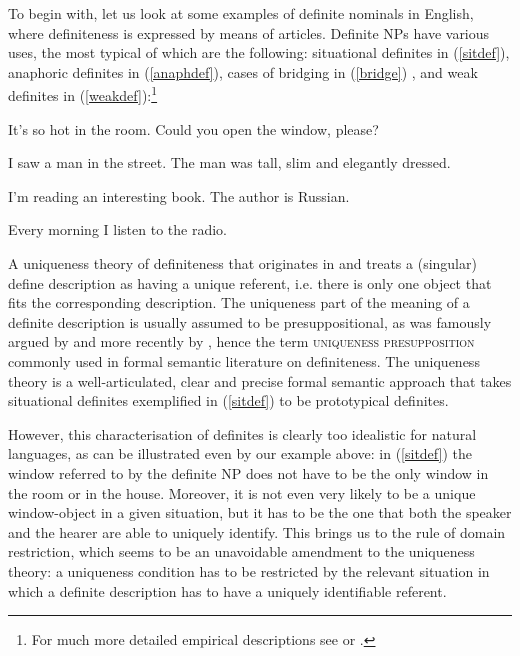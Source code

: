 \documentclass[output=paper,colorlinks,citecolor=brown]{langscibook}
\begin{document}
To begin with, let us look at some examples of definite nominals in English, where definiteness is expressed by means of articles. Definite NPs have various uses, the most typical of which are the following: situational definites in (\ref{sitdef}), anaphoric definites in (\ref{anaphdef}), cases of bridging in (\ref{bridge}) \citep{clark75}, and weak definites in (\ref{weakdef}):\footnote{For much more detailed empirical descriptions see \citet{hawkins78} or \citet{lyons99}.} 


\ea 
It's so hot in the room. Could you open the window, please? \label{sitdef}
\z

\ea
I saw a man in the street. The man was tall, slim and elegantly dressed. \label{anaphdef}
\z

\ea
I'm reading an interesting book. The author is Russian. \label{bridge}
\z 

\ea
Every morning I listen to the radio. \label{weakdef}
\z

\noindent A uniqueness theory of definiteness that originates in \citet{frege92} and \citet{russell05} treats a (singular) define description as having a unique referent, i.e. there is only one object that fits the corresponding description. The uniqueness part of the meaning of a definite description is usually assumed to be presuppositional, as was famously argued by \citet{strawson50} and more recently by \citet{elbourne13}, hence the term \textsc{uniqueness presupposition} commonly used in formal semantic literature on definiteness. The uniqueness theory is a well-articulated, clear and precise formal semantic approach that takes situational definites exemplified in (\ref{sitdef}) to be prototypical definites. 

However, this characterisation of definites is clearly too idealistic for natural languages, as can be illustrated even by our example above: in (\ref{sitdef}) the window referred to by the definite NP does not have to be the only window in the room or in the house. Moreover, it is not even very likely to be a unique window-object in a given situation, but it has to be the one that both the speaker and the hearer are able to uniquely identify. This brings us to the rule of domain restriction, which seems to be an unavoidable amendment to the uniqueness theory: a uniqueness condition has to be restricted by the relevant situation in which a definite description has to have a uniquely identifiable referent.
\end{document}
